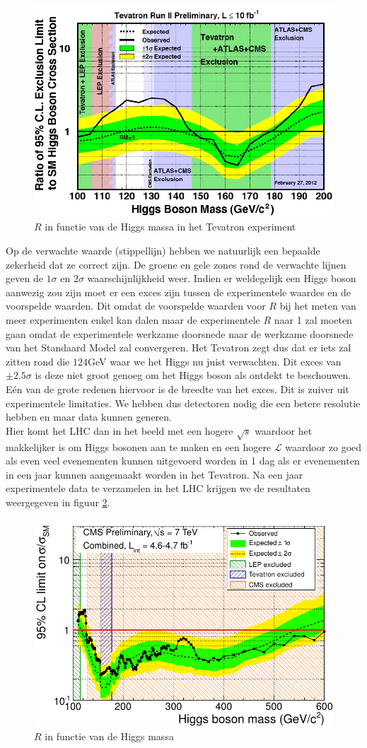 \documentclass[../main.tex]{subfiles}
\begin{document}
\begin{figure}[h]
    \centering
    \includegraphics[width=0.6\linewidth]{higgs_boson/zoektoacht_h_tevatron.png}
    \caption{$R$ in functie van de Higgs massa in het Tevatron experiment}%
    \label{fig:higgs_boson/zoektoacht_h_tevatron}
\end{figure}

Op de verwachte waarde (stippellijn) hebben we natuurlijk een bepaalde zekerheid dat ze correct zijn. De groene en gele zones rond de verwachte lijnen geven de $1\sigma$ en $2\sigma$ waarschijnlijkheid weer. Indien er weldegelijk een Higgs boson aanwezig zou zijn moet er een exces zijn tussen de experimentele waardes en de voorspelde waarden. Dit omdat de voorspelde waarden voor $R$ bij het meten van meer experimenten enkel kan dalen maar de experimentele $R$ naar 1 zal moeten gaan omdat de experimentele werkzame doorsnede naar de werkzame doorsnede van het Standaard Model zal convergeren. Het Tevatron zegt dus dat er iets zal zitten rond die $124$GeV waar we het Higgs nu juist verwachten. Dit exces van $\pm 2.5\sigma$ is deze niet groot genoeg om het Higgs boson als ontdekt te beschouwen. Eén van de grote redenen hiervoor is de breedte van het exces. Dit is zuiver uit experimentele limitaties. We hebben dus detectoren nodig die een betere resolutie hebben en maar data kunnen generen.\\
Hier komt het LHC dan in het beeld met een hogere $\sqrt{s}$ waardoor het makkelijker is om Higgs bosonen aan te maken en een hogere $\mathcal{L}$ waardoor zo goed als even veel evenementen kunnen uitgevoerd worden in 1 dag als er evenementen in een jaar kunnen aangemaakt worden in het Tevatron. Na een jaar experimentele data te verzamelen in het LHC krijgen we de resultaten weergegeven in figuur \ref{fig:higgs_boson/zoektocht_naar_h}.

\begin{figure}[h]
    \centering
    \includegraphics[width=0.6\linewidth]{higgs_boson/zoektocht_naar_h.png}
    \caption{$R$ in functie van de Higgs massa}%
    \label{fig:higgs_boson/zoektocht_naar_h}
\end{figure}
\end{document}
